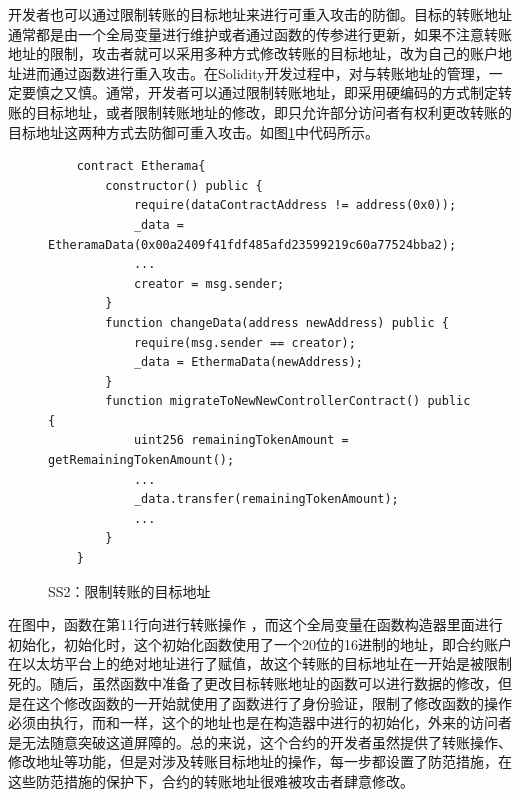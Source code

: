 开发者也可以通过限制转账的目标地址来进行可重入攻击的防御。目标的转账地址通常都是由一个全局变量进行维护或者通过函数的传参进行更新，如果不注意转账地址的限制，攻击者就可以采用多种方式修改转账的目标地址，改为自己的账户地址进而通过函数进行重入攻击。在Solidity开发过程中，对与转账地址的管理，一定要慎之又慎。通常，开发者可以通过限制转账地址，即采用硬编码的方式制定转账的目标地址，或者限制转账地址的修改，即只允许部分访问者有权利更改转账的目标地址这两种方式去防御可重入攻击。如图\ref{fig:ss2_example}中代码所示。
\begin{figure}
\begin{minipage}[htbp]{1.0\linewidth}
    \begin{lstlisting}
    contract Etherama{
        constructor() public {
            require(dataContractAddress != address(0x0));
            _data = EtheramaData(0x00a2409f41fdf485afd23599219c60a77524bba2);
            ...
            creator = msg.sender;
        }
        function changeData(address newAddress) public {
            require(msg.sender == creator);
            _data = EthermaData(newAddress);
        }
        function migrateToNewNewControllerContract() public {
            uint256 remainingTokenAmount = getRemainingTokenAmount();
            ...
            _data.transfer(remainingTokenAmount);
            ...
        }
    }
\end{lstlisting}
\end{minipage}
\vspace{-5mm}
\caption{SS2：限制转账的目标地址}
\label{fig:ss2_example}
\end{figure}
在图中，函数在第11行向进行转账操作 ，而这个全局变量在函数构造器里面进行初始化，初始化时，这个初始化函数使用了一个20位的16进制的地址，即合约账户在以太坊平台上的绝对地址进行了赋值，故这个转账的目标地址在一开始是被限制死的。随后，虽然函数中准备了更改目标转账地址的函数可以进行数据的修改，但是在这个修改函数的一开始就使用了函数进行了身份验证，限制了修改函数的操作必须由执行，而和一样，这个的地址也是在构造器中进行的初始化，外来的访问者是无法随意突破这道屏障的。总的来说，这个合约的开发者虽然提供了转账操作、修改地址等功能，但是对涉及转账目标地址的操作，每一步都设置了防范措施，在这些防范措施的保护下，合约的转账地址很难被攻击者肆意修改。

